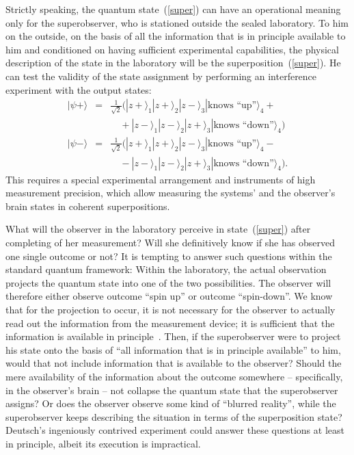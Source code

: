 \documentclass[12pt]{article}
\begin{document}
Strictly speaking, the quantum state~(\ref{super}) can have an operational meaning only for the superobserver, who is stationed outside the sealed laboratory. To him on the outside, on the basis of all the information that is in principle available to him and conditioned on having sufficient experimental capabilities, the physical description of the state in the laboratory will be the superposition~(\ref{super}). He can test the validity of the state assignment by performing an interference experiment with the output states:
\begin{eqnarray}
|\psi+\rangle &=&\frac{1}{\sqrt{2}} (|z+\rangle_1|z+\rangle_2|z-\rangle_3|\mbox{knows ``up''}\rangle_4 + \nonumber \\
&& \quad {} + |z-\rangle_1|z-\rangle_2|z+\rangle_3 |\mbox{knows ``down''}\rangle_4) \nonumber \\
|\psi- \rangle &=& \frac{1}{\sqrt{2}} (|z+\rangle_1|z+\rangle_2|z-\rangle_3|\mbox{knows ``up''}\rangle_4 - \nonumber\\
&& \quad {} - |z-\rangle_1|z-\rangle_2|z+\rangle_3 |\mbox{knows ``down''}\rangle_4). \nonumber
\end{eqnarray}
This requires a special experimental arrangement and instruments of high measurement precision, which allow measuring the systems' and the observer's brain states in coherent superpositions.

What will the observer in the laboratory perceive in state~(\ref{super}) after completing of her measurement? Will she definitively know if she has observed one single outcome or not? It is tempting to answer such questions within the standard quantum framework: Within the laboratory, the actual observation projects the quantum state into one of the two possibilities. The observer will therefore either observe outcome ``spin up'' or outcome ``spin-down''. We know that for the projection to occur, it is not necessary for the observer to actually read out the information from the measurement device; it is sufficient that the information is available in principle~\cite{mandel}. Then, if the superobserver were to project his state onto the basis of ``all information that is in principle available'' to him, would that not include information that is available to the observer? Should the mere availability of the information about the outcome somewhere -- specifically, in the observer's brain -- not collapse the quantum state that the superobserver assigns? Or does the observer observe some kind of ``blurred reality'', while the superobserver keeps describing the situation in terms of the superposition state? Deutsch's ingeniously contrived experiment could answer these questions at least in principle, albeit its execution is impractical. 
\end{document}

